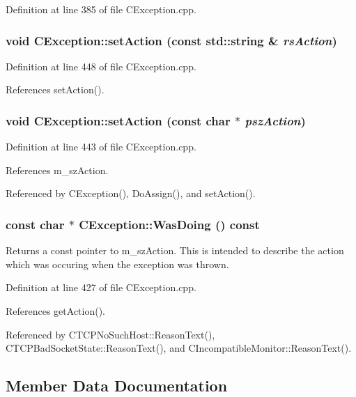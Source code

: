 Definition at line 385 of file CException.cpp.
\subsubsection{\setlength{\rightskip}{0pt plus 5cm}void CException::set\-Action (const std::string \& {\em rs\-Action})\hspace{0.3cm}{\tt  [protected]}}\label{classCException_b1}




Definition at line 448 of file CException.cpp.

References set\-Action().
\subsubsection{\setlength{\rightskip}{0pt plus 5cm}void CException::set\-Action (const char $\ast$ {\em psz\-Action})\hspace{0.3cm}{\tt  [protected]}}\label{classCException_b0}




Definition at line 443 of file CException.cpp.

References m\_\-sz\-Action.

Referenced by CException(), Do\-Assign(), and set\-Action().
\subsubsection{\setlength{\rightskip}{0pt plus 5cm}const char $\ast$ CException::Was\-Doing () const}\label{classCException_a10}


Returns a const pointer to m\_\-sz\-Action. This is intended to describe the action  which was occuring when the exception was thrown. 

Definition at line 427 of file CException.cpp.

References get\-Action().

Referenced by CTCPNo\-Such\-Host::Reason\-Text(), CTCPBad\-Socket\-State::Reason\-Text(), and CIncompatible\-Monitor::Reason\-Text().

\subsection{Member Data Documentation}
